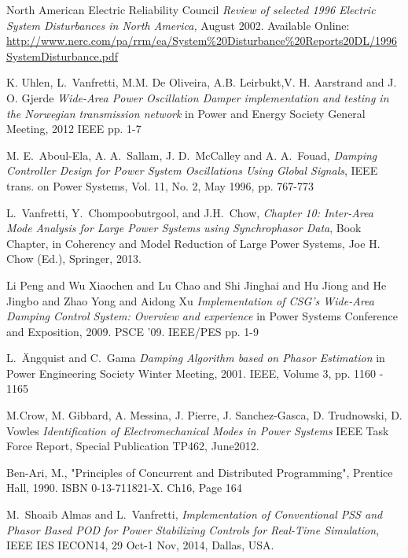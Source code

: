\documentclass[conference]{IEEEtran}
\begin{document}
\begin{thebibliography}{1}

 North American Electric Reliability Council \emph{Review of selected 1996 Electric System Disturbances in North America,} August 2002. Available Online: \url{http://www.nerc.com/pa/rrm/ea/System\%20Disturbance\%20Reports20DL/1996SystemDisturbance.pdf}

 K. Uhlen, L.~Vanfretti, M.M. De Oliveira, A.B. Leirbukt,V. H. Aarstrand and J. O. Gjerde \emph{Wide-Area Power Oscillation Damper implementation and testing in the Norwegian transmission network} in Power and Energy Society General Meeting, 2012 IEEE pp. 1-7

  M. E.~Aboul-Ela, A. A.~Sallam, J. D.~McCalley and A. A.~Fouad, \emph{Damping Controller Design for Power System Oscillations Using Global Signals}, IEEE trans. on Power Systems, Vol. 11, No. 2, May 1996, pp. 767-773

  L.~Vanfretti, Y.~Chompoobutrgool, and J.H.~Chow, \emph{Chapter 10: Inter-Area Mode Analysis for Large Power Systems using Synchrophasor Data}, Book Chapter, in Coherency and Model Reduction of Large Power Systems, Joe H. Chow (Ed.), Springer, 2013.

 Li Peng and Wu Xiaochen and Lu Chao and Shi Jinghai and Hu Jiong and He Jingbo and Zhao Yong and Aidong Xu \emph{Implementation of CSG's Wide-Area Damping Control System: Overview and experience} in Power Systems Conference and Exposition, 2009. PSCE '09. IEEE/PES pp. 1-9

 L.~\"{A}ngquist and C.~Gama  \emph{Damping Algorithm based on Phasor Estimation} in Power Engineering Society Winter Meeting, 2001. IEEE, Volume 3, pp. 1160 - 1165  

 M.Crow, M. Gibbard, A. Messina, J. Pierre, J. Sanchez-Gasca, D. Trudnowski, D. Vowles \emph{Identification of Electromechanical Modes in Power Systems} IEEE Task Force Report, Special Publication TP462, June2012.

 Ben-Ari, M., "Principles of Concurrent and Distributed Programming", Prentice Hall, 1990. ISBN 0-13-711821-X. Ch16, Page 164

 M.~Shoaib Almas and L.~Vanfretti, \emph{Implementation of Conventional PSS and Phasor Based POD for Power Stabilizing Controls for Real-Time Simulation}, IEEE IES IECON14, 29 Oct-1 Nov, 2014, Dallas, USA.


\end{thebibliography}
\end{document}
